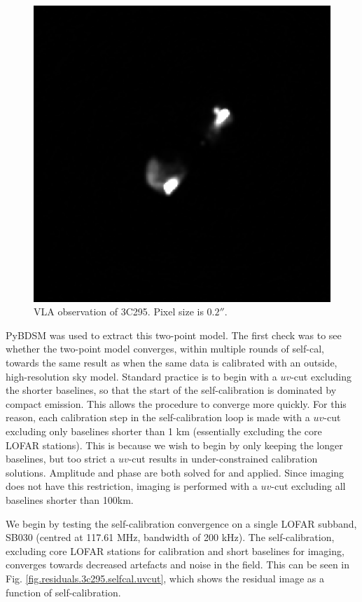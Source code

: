 \begin{figure}[h!]
\includegraphics[width=0.5\linewidth]{images/3c295-vla}
\caption{\label{fig.vla.3c295}VLA observation of 3C295. Pixel size is $0.2''$.}
\end{figure}

\pg
PyBDSM \citep{2015ascl.soft02007M} was used to extract this two-point model. The first check was to see whether the two-point model converges, within multiple rounds of self-cal, towards the same result as when the same data is calibrated with an outside, high-resolution sky model. Standard practice is to begin with a $uv$-cut excluding the shorter baselines, so that the start of the self-calibration is dominated by compact emission. This allows the procedure to converge more quickly. For this reason, each calibration step in the self-calibration loop is made with a $uv$-cut excluding only baselines shorter than 1 km (essentially excluding the core LOFAR stations). This is because we wish to begin by only keeping the longer baselines, but too strict a $uv$-cut results in under-constrained calibration solutions. Amplitude and phase are both solved for and applied. Since imaging does not have this restriction, imaging is performed with a $uv$-cut excluding all baselines shorter than 100km. 

\pg
We begin by testing the self-calibration convergence on a single LOFAR subband, SB030 (centred at 117.61 MHz, bandwidth of 200 kHz). The self-calibration, excluding core LOFAR stations for calibration and short baselines for imaging, converges towards decreased artefacts and noise in the field. This can be seen in Fig. \ref{fig.residuals.3c295.selfcal.uvcut}, which shows the residual image as a function of self-calibration. 

